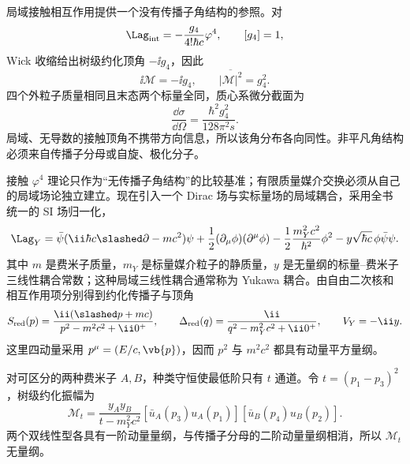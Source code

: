 
局域接触相互作用提供一个没有传播子角结构的参照。对
\begin{equation*}
 \Lag_{\rm int}=-\frac{g_4}{4!\hbar c}\varphi^4,
 \qquad [g_4]=1,
\end{equation*}
Wick 收缩给出树级约化顶角 $-\ii g_4$，因此
\begin{equation}
 \ii\mathcal M=-\ii g_4,
 \qquad
 \overline{|\mathcal M|^2}=g_4^2.
 \label{eq:phi4-M-tree-si-r10}
\end{equation}
四个外粒子质量相同且末态两个标量全同，质心系微分截面为
\begin{equation}
 {
 \frac{\dd\sigma}{\dd\Omega}
 =\frac{\hbar^2g_4^2}{128\pi^2s}.}
 \label{eq:phi4-isotropic-cross-si-r10}
\end{equation}
局域、无导数的接触顶角不携带方向信息，所以该角分布各向同性。非平凡角结构必须来自传播子分母或自旋、极化分子。

接触 $\varphi^4$ 理论只作为“无传播子角结构”的比较基准；有限质量媒介交换必须从自己的局域场论独立建立。现在引入一个 Dirac 场与实标量场的局域耦合，采用全书统一的 SI 场归一化，
\begin{equation}
 {
 \Lag_Y
 =\bar\psi(\ii\hbar c\slashed\partial-mc^2)\psi
 +\frac12(\partial_\mu\phi)(\partial^\mu\phi)
 -\frac12\frac{m_Y^2c^2}{\hbar^2}\phi^2
 -y\sqrt{\hbar c}\,\phi\bar\psi\psi.}
 \label{eq:yukawa-full-si-r10}
\end{equation}
其中 $m$ 是费米子质量，$m_Y$ 是标量媒介粒子的静质量，$y$ 是无量纲的标量--费米子三线性耦合常数；这种局域三线性耦合通常称为 Yukawa 耦合。由自由二次核和相互作用项分别得到约化传播子与顶角
\begin{equation}
 S_{\rm red}(p)=\frac{\ii(\slashed p+mc)}{p^2-m^2c^2+\ii0^+},
 \qquad
 \Delta_{\rm red}(q)=\frac{\ii}{q^2-m_Y^2c^2+\ii0^+},
 \qquad
 V_Y=-\ii y.
 \label{eq:yukawa-propagators-si-r10}
\end{equation}
这里四动量采用 $p^\mu=(E/c,\vb{p})$，因而 $p^2$ 与 $m^2c^2$ 都具有动量平方量纲。

对可区分的两种费米子 $A,B$，种类守恒使最低阶只有 $t$ 通道。令 $t=(p_1-p_3)^2$，树级约化振幅为
\begin{equation}
 {
 \mathcal M_t
 =\frac{y_Ay_B}{t-m_Y^2c^2}
 [\bar u_A(p_3)u_A(p_1)]
 [\bar u_B(p_4)u_B(p_2)].}
 \label{eq:yukawa-distinguishable-M-si-r10}
\end{equation}
两个双线性型各具有一阶动量量纲，与传播子分母的二阶动量量纲相消，所以 $\mathcal M_t$ 无量纲。

